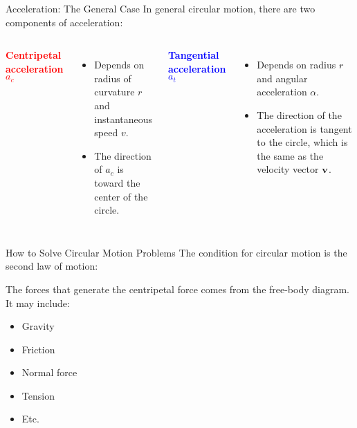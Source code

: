 \documentclass[12pt,compress,aspectratio=169]{beamer}
\newcommand{\mb}[1]{\ensuremath\mathbf{#1}}
\newcommand{\eq}[2]{\vspace{#1}{\Large\begin{displaymath}#2\end{displaymath}}}
\begin{document}
\begin{frame}{Acceleration: The General Case}
  In general circular motion, there are two components of acceleration:
  \vspace{.2in}
  \begin{columns}
    
    \textcolor{red}{\textbf{Centripetal acceleration} $a_c$}
    \begin{itemize}
    \item Depends on radius of curvature $r$ and instantaneous speed $v$.
    \item The direction of $a_c$ is toward the center of the circle.
    \end{itemize}
    \textcolor{blue}{\textbf{Tangential acceleration} $a_t$}
    \begin{itemize}
    \item Depends on radius $r$  and angular acceleration $\alpha$.
    \item The direction of the acceleration is tangent to the circle, which
      is the same as the velocity vector $\mb{v}$.
    \end{itemize}
  \end{columns}
\end{frame}



\begin{frame}{How to Solve Circular Motion Problems}
  The condition for circular motion is the second law of motion:

  \eq{-.2in}{
    \mb{F}_c=\sum\mb{F}=m\mb{a}_c
  }
  
  The forces that generate the centripetal force comes from the free-body
  diagram. It may include:
  \begin{itemize}
  \item Gravity
  \item Friction
  \item Normal force
  \item Tension
  \item Etc.
  \end{itemize}
\end{frame}
\end{document}
